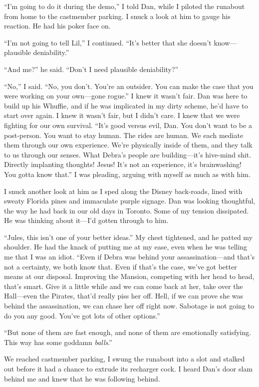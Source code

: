 “I'm going to do it during the demo,” I told Dan, while I piloted
the runabout from home to the castmember parking. I snuck a look at
him to gauge his reaction. He had his poker face on.

“I'm not going to tell Lil,” I continued. “It's better that she
doesn't know—plausible deniability.”

“And me?” he said. “Don't I need plausible deniability?”

“No,” I said. “No, you don't. You're an outsider. You can make the
case that you were working on your own—gone rogue.” I knew it
wasn't fair. Dan was here to build up his Whuffie, and if he was
implicated in my dirty scheme, he'd have to start over again. I
knew it wasn't fair, but I didn't care. I knew that we were
fighting for our own survival. “It's good versus evil, Dan. You
don't want to be a post-person. You want to stay human. The rides
are human. We each mediate them through our own experience. We're
physically inside of them, and they talk to us through our senses.
What Debra's people are building—it's hive-mind shit. Directly
implanting thoughts! Jesus! It's not an experience, it's
brainwashing! You gotta know that.” I was pleading, arguing with
myself as much as with him.

I snuck another look at him as I sped along the Disney back-roads,
lined with sweaty Florida pines and immaculate purple signage. Dan
was looking thoughtful, the way he had back in our old days in
Toronto. Some of my tension dissipated. He was thinking about
it—I'd gotten through to him.

“Jules, this isn't one of your better ideas.” My chest tightened,
and he patted my shoulder. He had the knack of putting me at my
ease, even when he was telling me that I was an idiot. “Even if
Debra was behind your assassination—and that's not a certainty, we
both know that. Even if that's the case, we've got better means at
our disposal. Improving the Mansion, competing with her head to
head, that's smart. Give it a little while and we can come back at
her, take over the Hall—even the Pirates, that'd really piss her
off. Hell, if we can prove she was behind the assassination, we can
chase her off right now. Sabotage is not going to do you any good.
You've got lots of other options.”

“But none of them are fast enough, and none of them are emotionally
satisfying. This way has some goddamn \emph{balls}.”

We reached castmember parking, I swung the runabout into a slot and
stalked out before it had a chance to extrude its recharger cock. I
heard Dan's door slam behind me and knew that he was following
behind.

